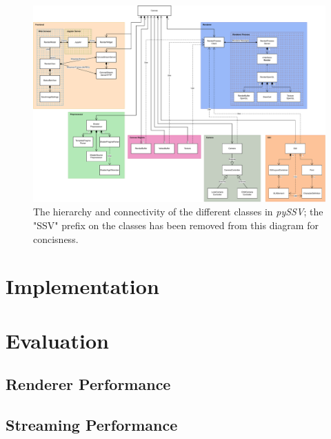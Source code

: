 \documentclass{l4proj}
\begin{document}
\begin{figure}[h]
    \centering
    \includegraphics[width=1.0\linewidth]{images/SSV-Class-Hierarchy}

    \caption{The hierarchy and connectivity of the different classes in \emph{pySSV}; the "SSV" prefix on the classes
    has been removed from this diagram for concisness.}

    \label{fig:class-hierarchy}
\end{figure}

\chapter{Implementation}\label{ch:implementation}


\chapter{Evaluation}\label{ch:evaluation}


\section{Renderer Performance}\label{sec:renderer-performance}

\section{Streaming Performance}\label{sec:streaming-performance}
\end{document}
